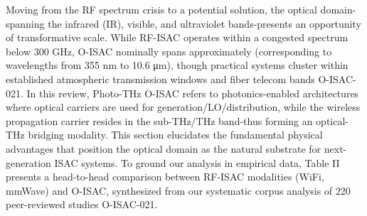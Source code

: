 {}\markdownRendererSoftLineBreak
{}\markdownRendererInterblockSeparator
{}
\markdownRendererSectionEnd \markdownRendererSectionBegin
{}\markdownRendererInterblockSeparator
{}Moving from the RF spectrum crisis to a potential solution, the optical domain-spanning the infrared (IR), visible, and ultraviolet bands-presents an opportunity of transformative scale. While RF-ISAC operates within a congested spectrum below 300 GHz, O-ISAC nominally spans approximately  (corresponding to wavelengths from 355 nm to 10.6 μm), though practical systems cluster within established atmospheric transmission windows and fiber telecom bands O-ISAC-021. In this review, Photo-THz O-ISAC refers to photonics-enabled architectures where optical carriers are used for generation/LO/distribution, while the wireless propagation carrier resides in the sub-THz/THz band-thus forming an optical-THz bridging modality. This section elucidates the fundamental physical advantages that position the optical domain as the natural substrate for next-generation ISAC systems.\markdownRendererInterblockSeparator
{}\markdownRendererSectionBegin
{}\markdownRendererInterblockSeparator
{}To ground our analysis in empirical data, Table II presents a head-to-head comparison between RF-ISAC modalities (WiFi, mmWave) and O-ISAC, synthesized from our systematic corpus analysis of 220 peer-reviewed studies O-ISAC-021.\markdownRendererParagraphSeparator
{}\markdownRendererInterblockSeparator
